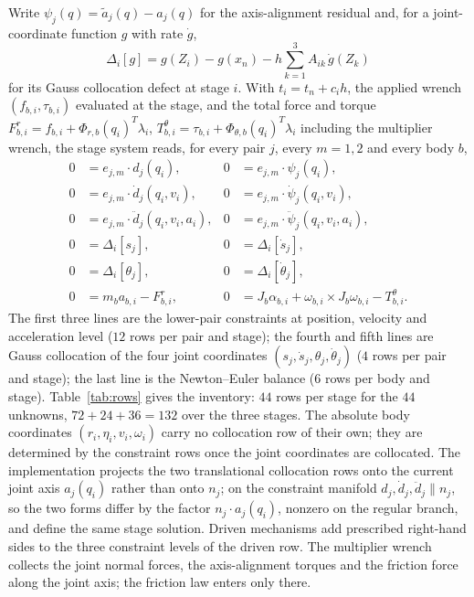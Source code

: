 \documentclass[preprint,12pt]{elsarticle}
\begin{document}
Write $\psi_j(q)=\tilde a_j(q)-a_j(q)$ for the axis-alignment residual and, for a joint-coordinate
function $g$ with rate $\dot g$,
\begin{equation}
  \Delta_i[g]=g(Z_i)-g(x_n)-h\sum_{k=1}^3A_{ik}\,\dot g(Z_k)
  \label{eq:collocation-defect-operator}
\end{equation}
for its Gauss collocation defect at stage $i$. With $t_i=t_n+c_ih$, the applied wrench
$(f_{b,i},\tau_{b,i})$ evaluated at the stage, and the total force and torque
$F^r_{b,i}=f_{b,i}+\Phi_{r,b}(q_i)^T\lambda_i$, $T^\theta_{b,i}=\tau_{b,i}+\Phi_{\theta,b}(q_i)^T\lambda_i$
including the multiplier wrench, the stage system reads, for every pair $j$, every $m=1,2$ and
every body $b$,
\begin{equation}
\label{eq:g6fullva-expanded-stage}
\begin{aligned}
0 &= e_{j,m}\cdot d_j(q_i), &
0 &= e_{j,m}\cdot\psi_j(q_i),\\
0 &= e_{j,m}\cdot\dot d_j(q_i,v_i), &
0 &= e_{j,m}\cdot\dot\psi_j(q_i,v_i),\\
0 &= e_{j,m}\cdot\ddot d_j(q_i,v_i,a_i), &
0 &= e_{j,m}\cdot\ddot\psi_j(q_i,v_i,a_i),\\
0 &= \Delta_i[s_j], & 0 &= \Delta_i[\dot s_j],\\
0 &= \Delta_i[\theta_j], & 0 &= \Delta_i[\dot\theta_j],\\
0 &= m_b a_{b,i}-F^r_{b,i}, &
0 &= J_b\alpha_{b,i}+\omega_{b,i}\times J_b\omega_{b,i}-T^\theta_{b,i} .
\end{aligned}
\end{equation}
The first three lines are the lower-pair constraints at position, velocity and acceleration level
($12$ rows per pair and stage); the fourth and fifth lines are Gauss collocation of the four joint
coordinates $(s_j,\dot s_j,\theta_j,\dot\theta_j)$ ($4$ rows per pair and stage); the last line is
the Newton--Euler balance ($6$ rows per body and stage). Table~\ref{tab:rows} gives the inventory:
$44$ rows per stage for the $44$ unknowns, $72+24+36=132$ over the three stages. The absolute body
coordinates $(r_i,\eta_i,v_i,\omega_i)$ carry no collocation row of their own; they are determined
by the constraint rows once the joint coordinates are collocated. The implementation projects the
two translational collocation rows onto the current joint axis $a_j(q_i)$ rather than onto $n_j$;
on the constraint manifold $d_j,\dot d_j,\ddot d_j\parallel n_j$, so the two forms differ by the
factor $n_j\cdot a_j(q_i)$, nonzero on the regular branch, and define the same stage solution.
Driven mechanisms add prescribed right-hand sides to the three constraint levels of the driven
row. The multiplier wrench collects the joint normal forces, the axis-alignment torques and the
friction force along the joint axis; the friction law enters only there.
\end{document}
